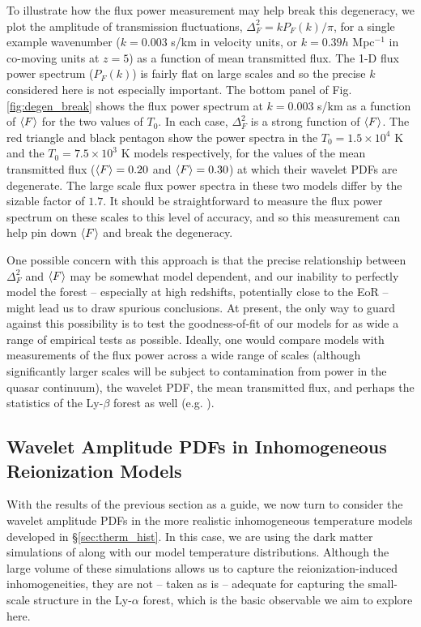 To illustrate how the flux power measurement may help break this degeneracy, we plot the
amplitude of transmission fluctuations, $\Delta^2_F =k P_F(k)/\pi$, for a single example wavenumber ($k=0.003$ s/km in velocity units, or $k=0.39 h$ Mpc$^{-1}$
in co-moving units at $z=5$) as a function of mean transmitted flux.  The 1-D flux power spectrum ($P_F(k)$) is fairly flat on large scales and so the precise $k$ considered
here is not especially important.  The bottom panel of Fig. \ref{fig:degen_break} shows the flux power spectrum at $k=0.003$ s/km
as a function of $\langle F \rangle$ for the two values of $T_0$. In each case, $\Delta^2_F$ is a strong function of $\langle F \rangle$. The red
triangle and black pentagon show the power spectra in the $T_0 = 1.5 \times 10^4$ K and the $T_0 = 7.5 \times 10^3$ K
models respectively, for the values of the mean transmitted flux ($\langle F \rangle=0.20$ and $\langle F \rangle=0.30$) at which their wavelet
PDFs are degenerate. The large scale flux power spectra in these two models differ by the sizable factor of $1.7$. It should be
straightforward to measure the flux power spectrum on these scales to this level of accuracy, and so this measurement can help
pin down $\langle F \rangle$ and break the degeneracy.

One possible concern with this approach is that the precise relationship between $\Delta^2_F$ and $\langle F \rangle$ may be somewhat model dependent, and our inability to perfectly model the forest -- especially at high redshifts, potentially close to the EoR -- 
might lead us to draw spurious conclusions. At present, the only way to guard against this possibility is to test the goodness-of-fit
of our models for as wide a range of empirical tests as possible. Ideally, one would compare models with measurements of the
flux power across a wide range of scales (although significantly larger scales will be subject to contamination from power in
the quasar continuum), the wavelet PDF, the mean transmitted
flux, and perhaps the statistics of the Ly-$\beta$ forest as well (e.g. \citealt{Dijkstra:2003pd,Furlanetto:2009kr}).  


\subsection{Wavelet Amplitude PDFs in Inhomogeneous Reionization Models}
\label{sec:wave_inhomog}

With the results of the previous section as a guide, we now turn to consider the wavelet amplitude PDFs in the more realistic inhomogeneous temperature models developed 
in \S \ref{sec:therm_hist}. In this case, we are using the dark matter simulations of \citet{McQuinn:2007dy} along with our model temperature
distributions.
Although the large volume of these simulations allows us to capture the reionization-induced inhomogeneities, they 
are not -- taken as is -- adequate
for capturing the small-scale structure in the Ly-$\alpha$ forest, which is the basic observable we aim to explore here. 

